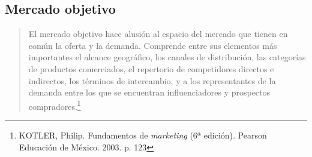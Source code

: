 \subsection{Mercado objetivo}
\begin{quote}
El mercado objetivo hace alusi\'on al espacio del mercado que tienen en com\'un la oferta y la demanda. Comprende entre sus elementos m\'as importantes el alcance geogr\'afico, los canales de distribuci\'on, las categor\'ias de productos comerciados, el repertorio de competidores directos e indirectos, los t\'erminos de intercambio, y a los representantes de la demanda entre los que se encuentran influenciadores y prospectos compradores.\footnote{KOTLER, Philip.  Fundamentos de \textit{marketing} (6ª edici\'on). Pearson Educaci\'on de M\'exico. 2003. p. 123}
\end{quote}
\pagebreak
